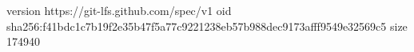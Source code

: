 version https://git-lfs.github.com/spec/v1
oid sha256:f41bdc1c7b19f2e35b47f5a77c9221238eb57b988dec9173afff9549e32569c5
size 174940
